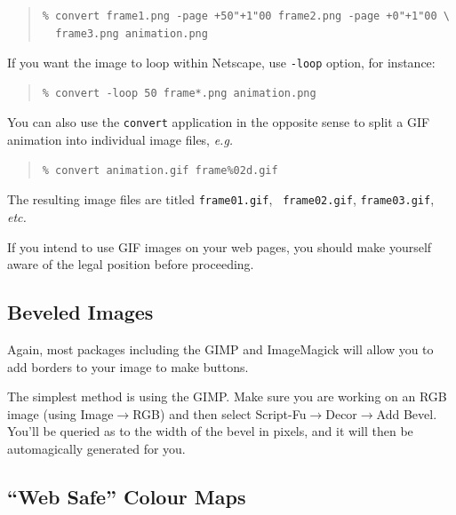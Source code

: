 \documentclass[twoside,11pt]{article}
\newcommand{\htmlref}[2]{#1}
\newcommand{\xlabel}[1]{}
\begin{document}
\small
\begin{quote}
\begin{verbatim}
% convert frame1.png -page +50"+1"00 frame2.png -page +0"+1"00 \
  frame3.png animation.png
\end{verbatim}
\end{quote}
\normalsize

If you want the image to loop within Netscape, use {\tt -loop} option, for instance: 

\small
\begin{quote}
\begin{verbatim}
% convert -loop 50 frame*.png animation.png
\end{verbatim}
\end{quote}
\normalsize

You can also use the {\tt convert} application in the opposite sense
to split a GIF animation into individual image files, {\em e.g.\ }

\small
\begin{quote}
\begin{verbatim}
% convert animation.gif frame%02d.gif
\end{verbatim}
\end{quote}
\normalsize

The resulting image files are titled {\tt frame01.gif}, {\tt
frame02.gif}, {\tt frame03.gif}, {\em etc.} 

If you intend to use GIF images on your web pages, you should make
yourself aware of the \htmlref{legal position}{sc15_giflegal} before
proceeding.
  
\subsection{\xlabel{sc15_bevel}Beveled Images\label{sc15_bevel}}
        
Again, most packages including the \htmlref{GIMP}{sc15_gimp} and
\htmlref{ImageMagick}{sc15_magick} will allow you to add borders to
your image to make buttons.

The simplest method is using the GIMP. Make sure you are working on an
RGB image (using {\sc Image}$\rightarrow${RGB}) and then select {\sc
Script-Fu}$\rightarrow${\sc Decor}$\rightarrow${\sc Add Bevel}. You'll
be queried as to the width of the bevel in pixels, and it will then be
automagically generated for you.  
  
\subsection{\xlabel{sc15_websafe}``Web Safe'' Colour Maps\label{sc15_websafe}}
\end{document}
